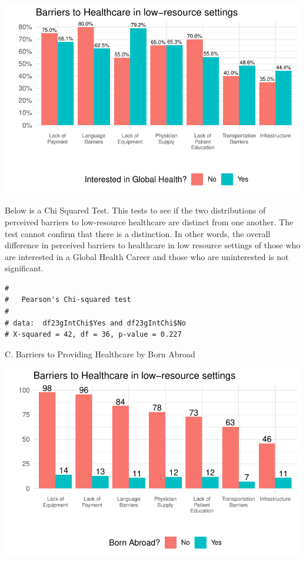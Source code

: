 \documentclass[
  letterpaper,
  DIV=11,
  numbers=noendperiod]{scrartcl}
\begin{document}
\includegraphics{GlobalHealthQuarto11-15_files/figure-pdf/unnamed-chunk-4-1.pdf}

\newpage

Below is a Chi Squared Test. This tests to see if the two distributions
of perceived barriers to low-resource healthcare are distinct from one
another. The test cannot confirm that there is a distinction. In other
words, the overall difference in perceived barriers to healthcare in low
resource settings of those who are interested in a Global Health Career
and those who are uninterested is not significant.

\begin{verbatim}
# 
#   Pearson's Chi-squared test
# 
# data:  df23gIntChi$Yes and df23gIntChi$No
# X-squared = 42, df = 36, p-value = 0.227
\end{verbatim}

\newpage

C. Barriers to Providing Healthcare by Born Abroad

\includegraphics{GlobalHealthQuarto11-15_files/figure-pdf/unnamed-chunk-6-1.pdf}
\end{document}
